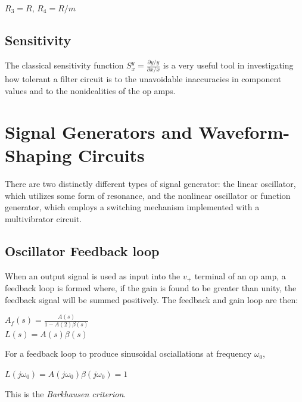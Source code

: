 \documentclass[11pt]{article}
\begin{document}
    $R_3 = R$, $R_4 = R/m$

    \subsection{Sensitivity}

    The classical sensitivity function
    $S^{y}_x = \frac{\partial{y}/y}{\partial{x}/x}$
    is a very useful tool in investigating how tolerant a filter circuit is to the unavoidable inaccuracies in component values and to the nonidealities of the op amps.


    \section{Signal Generators and Waveform-Shaping Circuits}

    There are two distinctly different types of signal generator: the linear oscillator, which utilizes some form of resonance, and the nonlinear oscillator or function generator, which employs a switching mechanism implemented with a multivibrator circuit.

    \subsection{Oscillator Feedback loop}

    When an output signal is used as input into the $v_+$ terminal of an op amp, a feedback loop is formed where, if the gain is found to be greater than unity, the feedback signal will be summed positively. The feedback and gain loop are then:
    
    \begin{center}
        $A_f(s) = \frac{A(s)}{1-A(2)\beta(s)}$ \\
        
        $L(s) = A(s)\beta(s)$       
    \end{center}
    
    For a feedback loop to produce sinusoidal osciallations at frequency $\omega_0$,

    \begin{center}
        $L(j\omega_0) = A(j\omega_0)\beta(j\omega_0) = 1$
    \end{center}
    
    This is the \textit{Barkhausen criterion}. \\
    
\end{document}
